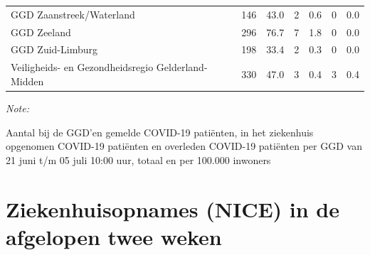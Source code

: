 \documentclass[
  english,
  man,floatsintext]{apa6}
\begin{document}
\begin{table}
\begin{threeparttable}
\begin{tabular}{lrrrrrr}
GGD Zaanstreek/Waterland & 146 & 43.0 & 2 & 0.6 & 0 & 0.0\\
GGD Zeeland & 296 & 76.7 & 7 & 1.8 & 0 & 0.0\\
GGD Zuid-Limburg & 198 & 33.4 & 2 & 0.3 & 0 & 0.0\\
Veiligheids- en Gezondheidsregio Gelderland-Midden & 330 & 47.0 & 3 & 0.4 & 3 & 0.4\\
\bottomrule
\end{tabular}
\begin{tablenotes}
\item \textit{Note: } 
\item Aantal bij de GGD’en gemelde COVID-19 patiënten, in het ziekenhuis opgenomen COVID-19 patiënten en overleden COVID-19 patiënten per GGD van 21 juni t/m 05 juli 10:00 uur, totaal en per 100.000 inwoners
\end{tablenotes}
\end{threeparttable}
\endgroup{}
\end{table}

\newpage

\hypertarget{ziekenhuisopnames-nice-in-de-afgelopen-twee-weken}{%
\section{Ziekenhuisopnames (NICE) in de afgelopen twee weken}\label{ziekenhuisopnames-nice-in-de-afgelopen-twee-weken}}
\end{document}
